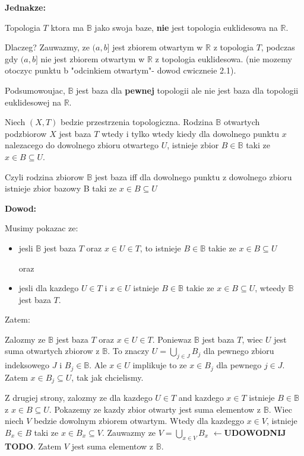 \documentclass{article}
\begin{document}
\textbf{Jednakze:}

Topologia $T$ ktora ma $\mathbb{B}$ jako swoja baze, \textbf{nie} jest topologia euklidesowa na $\mathbb{R}$.

Dlaczeg? Zauwazmy, ze $(a,b]$ jest zbiorem otwartym w $\mathbb{R}$ z topologia $T$, podczas gdy $(a,b]$ nie jest zbiorem otwartym w $\mathbb{R}$ z topologia euklidesowa. (nie mozemy otoczyc punktu b "odcinkiem otwartym"- dowod cwiczneie 2.1).

Podsumowoujac, $\mathbb{B}$ jest baza dla \textbf{pewnej} topologii ale nie jest baza dla topologii euklidesowej na $\mathbb{R}$.

\begin{tcolorbox}[colback=white!90!green,colframe=black!35!green,title=2.3.2 Lemat Baza topologii podejscie 2?]

    Niech $(X,T)$ bedzie przestrzenia topologiczna. Rodzina $\mathbb{B}$ otwartych podzbiorow $X$ jest baza $T$ wtedy i tylko wtedy kiedy dla dowolnego punktu $x$ nalezacego do dowolnego zbioru otwartego $U$, istnieje zbior $B \in \mathbb{B}$ taki ze $x \in B \subseteq U$.

    Czyli rodzina zbiorow $\mathbb{B}$ jest baza iff dla dowolnego punktu z dowolnego zbioru istnieje zbior bazowy B taki ze $x \in B \subseteq U$
\end{tcolorbox}

\textbf{Dowod:}

Musimy pokazac ze:
\begin{itemize}
    \item jesli $\mathbb{B}$ jest baza $T$ oraz $x \in U \in T$, to istnieje $B \in \mathbb{B}$ takie ze $x \in B \subseteq U$

        oraz
    \item jesli dla kazdego $U \in T$ i $x \in U$ istnieje $B \in \mathbb{B}$ takie ze $x \in B \subseteq U$, wteedy $\mathbb{B}$ jest baza $T$.
\end{itemize}

Zatem:

Zalozmy ze $\mathbb{B}$ jest baza $T$ oraz $x \in U \in T$. Poniewaz $\mathbb{B}$ jest baza $T$, wiec $U$ jest suma otwartych zbiorow z $\mathbb{B}$. To znaczy $U = \bigcup\limits_{j \in J}B_{j}$ dla pewnego zbioru indeksowego $J$ i $B_{j} \in \mathbb{B}$. Ale $x \in U$ implikuje to ze $x \in B_{j}$ dla pewnego $j \in J$. Zatem $x \in B_{j} \subseteq U$, tak jak chcielismy.

Z drugiej strony, zalozmy ze dla kazdego $U \in T$ and kazdego $x\in T$ istnieje $B \in \mathbb{B}$ z $x \in B \subseteq U$. Pokazemy ze kazdy zbior otwarty jest suma elementow z $\mathbb{B}$. Wiec niech $V$ bedzie dowolnym zbiorem otwartym. Wtedy dla kazdeggo $x \in V$, istnieje $B_{x} \in B$ taki ze $x \in B_{x} \subseteq V$. Zauwazmy ze $V = \bigcup\limits_{x \in V}B_{x}$ $\leftarrow$\textbf{UDOWODNIJ TODO}. Zatem $V$ jest suma elementow z $\mathbb{B}$.
\end{document}
